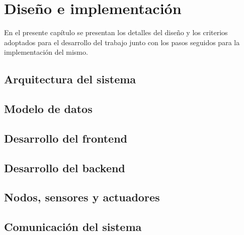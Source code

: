 \chapter{Diseño e implementación}

\label{Chapter3}

En el presente capítulo se presentan los detalles del diseño y los criterios adoptados para el desarrollo del trabajo junto con los pasos seguidos para la implementación del mismo.

\section{Arquitectura del sistema}



\section{Modelo de datos}



\section{Desarrollo del frontend}



\section{Desarrollo del backend}



\section{Nodos, sensores y actuadores}



\section{Comunicación del sistema}
